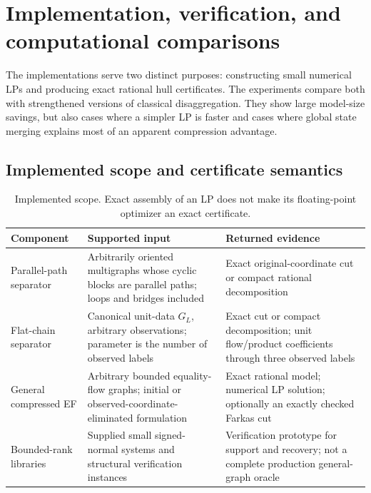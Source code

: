 \section{Implementation, verification, and computational comparisons}\label{sec:computation}


The implementations serve two distinct purposes: constructing small numerical
LPs and producing exact rational hull certificates. The experiments compare
both with strengthened versions of classical disaggregation. They show large
model-size savings, but also cases where a simpler LP is faster and cases where
global state merging explains most of an apparent compression advantage.

\subsection{Implemented scope and certificate semantics}

\begin{table}[tb]\centering\small
\caption{Implemented scope. Exact assembly of an LP does not make its
floating-point optimizer an exact certificate.}\label{tab:implemented-scope}
\begin{tabular}{>{\raggedright\arraybackslash}p{.19\linewidth}>{\raggedright\arraybackslash}p{.36\linewidth}>{\raggedright\arraybackslash}p{.36\linewidth}}\toprule
Component & Supported input & Returned evidence\\\midrule
Parallel-path separator & Arbitrarily oriented multigraphs whose cyclic
blocks are parallel paths; loops and bridges included & Exact original-coordinate
cut or compact rational decomposition\\[3pt]
Flat-chain separator & Canonical unit-data $G_L$, arbitrary observations;
parameter is the number of observed labels & Exact cut or compact decomposition;
unit flow/product coefficients through three observed labels\\[3pt]
General compressed EF & Arbitrary bounded equality-flow graphs; initial
or observed-coordinate-eliminated formulation & Exact rational model;
numerical LP solution; optionally an exactly checked Farkas cut\\[3pt]
Bounded-rank libraries & Supplied small signed-normal systems and structural
verification instances & Verification prototype for support and recovery;
not a complete production general-graph oracle\\\bottomrule
\end{tabular}
\end{table}

